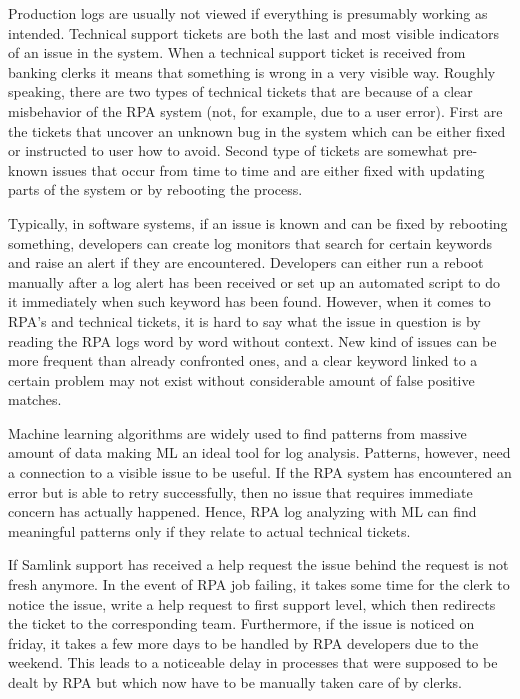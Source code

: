 Production logs are usually not viewed
if everything is presumably working as intended.
Technical support tickets are both
the last and most visible indicators of an issue in the system.
When a technical support ticket is received from banking clerks
it means that something is wrong
in a very visible way.
Roughly speaking,
there are two types of technical tickets
that are because of a clear misbehavior of the RPA system
(not, for example, due to a user error).\@
First are the tickets
that uncover an unknown bug in the system
which can be either fixed
or instructed to user how to avoid.
Second type of tickets are
somewhat pre-known issues
that occur from time to time
and are either fixed with updating parts of the system
or by rebooting the process.

Typically,
in software systems,
if an issue is known and can be fixed by rebooting something,
developers can create log monitors
that search for certain keywords
and raise an alert if they are encountered.
Developers can either run a reboot manually
after a log alert has been received
or set up an automated script to do it immediately
when such keyword has been found.
However,
when it comes to RPA's and technical tickets,
it is hard to say what the issue in question is
by reading the RPA logs word by word without context.
New kind of issues can be more frequent
than already confronted ones,
and a clear keyword linked to
a certain problem may not exist
without considerable amount of false positive matches.

Machine learning algorithms are widely used
to find patterns from massive amount of data
making ML an ideal tool for log analysis.
Patterns, however,
need a connection to a visible issue to be useful.
If the RPA system has encountered an error
but is able to retry successfully,
then no issue that requires immediate concern has actually happened.
Hence,
RPA log analyzing with ML can find meaningful patterns
only if they relate to actual technical tickets.

If Samlink support has received a help request
the issue behind the request is not fresh anymore.
In the event of RPA job failing,
it takes some time for the clerk to notice the issue,
write a help request to first support level,
which then redirects the ticket to the corresponding team.
Furthermore,
if the issue is noticed on friday,
it takes a few more days to be handled by RPA developers
due to the weekend.
This leads to a noticeable delay in processes
that were supposed to be dealt by RPA
but which now have to be manually taken care of
by clerks.

